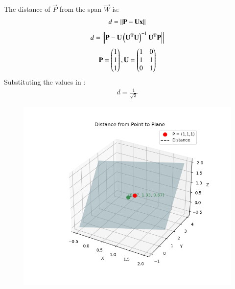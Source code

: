 \documentclass[journal]{IEEEtran}
\begin{document}
The distance of $\vec{P}$ from the span $\vec{W}$ is:
\begin{align}
d = \left\lVert\mathbf{P} - \mathbf{U}\mathbf{x}\right\rVert
\end{align}
\begin{align}
d = \left\lVert\mathbf{P} - \mathbf{U}\left(\mathbf{U^T}\mathbf{U}\right)^{-1} \mathbf{U^T}\mathbf{P}\right\rVert
\end{align}
\begin{align}
\mathbf{P} = \begin{pmatrix}1 \\ 1 \\ 1\end{pmatrix}, \mathbf{U} = \begin{pmatrix}1 & 0 \\ 1 & 1 \\ 0 & 1\end{pmatrix}
\end{align}
Substituting the values in :
\begin{align}
d = \frac{1}{\sqrt{3}}
\end{align}



    \begin{figure}[H]
        \centering
        \includegraphics[height=0.5\textheight, keepaspectratio]{figs/Figure_1.png}
        \label{figure_1}
    \end{figure}
\end{document}
